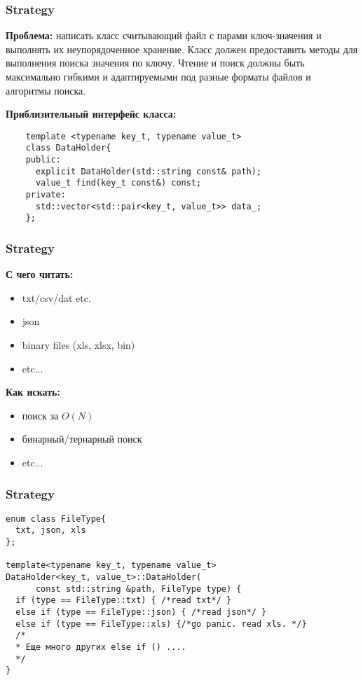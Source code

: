 \begin{frame}[fragile]
	\frametitle{Strategy}
	\textbf{Проблема:} написать класс считывающий файл с парами ключ-значения и выполнять их неупорядоченное хранение.
	Класс должен предоставить методы для выполнения поиска значения по ключу. Чтение и поиск должны быть максимально гибкими 
	и адаптируемыми под разные форматы файлов и алгоритмы поиска. 
	
	\vspace{10pt}
	\bf{Приблизительный интерфейс класса:}
	\begin{verbatim}
    template <typename key_t, typename value_t>
    class DataHolder{
    public:
      explicit DataHolder(std::string const& path);
      value_t find(key_t const&) const;
    private:
      std::vector<std::pair<key_t, value_t>> data_;
    };
	\end{verbatim}
\end{frame}

\begin{frame}
  \frametitle{Strategy}
  \textbf{С чего читать:}
  \begin{itemize}
    \item txt/csv/dat etc.
    \item json
    \item binary files (xls, xlsx, bin)
    \item etc...
  \end{itemize} 
  
  \vspace{10pt}
  
  \textbf{Как искать:}
  \begin{itemize}
    \item поиск за $O(N)$
    \item бинарный/тернарный поиск
    \item etc...
  \end{itemize} 

\end{frame}

\begin{frame}[fragile]
  \frametitle{Strategy}
  \begin{verbatim}
enum class FileType{
  txt, json, xls
};

template<typename key_t, typename value_t>
DataHolder<key_t, value_t>::DataHolder(
      const std::string &path, FileType type) {
  if (type == FileType::txt) { /*read txt*/ }
  else if (type == FileType::json) { /*read json*/ }
  else if (type == FileType::xls) {/*go panic. read xls. */}
  /*
  * Еще много других else if () ....
  */
}
  \end{verbatim}  
\end{frame}

